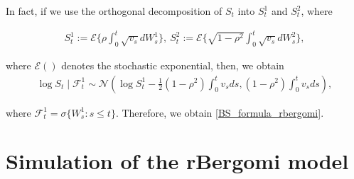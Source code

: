 \documentclass[11pt]{article}
\begin{document}
In fact, if we use the orthogonal decomposition of $S_t$ into $S_{t}^1$ and $S_{t}^2$, where

\begin{align}
	S_t^1:=\mathcal{E}\{ \rho \int_{0}^{t}  \sqrt{v_s} dW_s^1\}, \: S_t^2:= \mathcal{E}\{ \sqrt{1-\rho^2} \int_{0}^{t}  \sqrt{v_s} dW_s^2  \}	,
\end{align}

where $\mathcal{E}()$ denotes the stochastic exponential, then, we obtain
\begin{align}
	\log S_t \mid \mathcal{F}_t^1 \sim \mathcal{N}\left( \log S_t^1-\frac{1}{2} (1-\rho^2) \int_{0}^{t} v_s ds , (1-\rho^2) \int_{0}^{t} v_s ds \right),
\end{align} 

where $\mathcal{F}_t^1= \sigma\{ W_s^1: s\le t\}$. Therefore, we obtain \eqref{BS_formula_rbergomi}.









\section{Simulation of the rBergomi model}\label{sec:Simulation of the rBergomi model}
\end{document}
